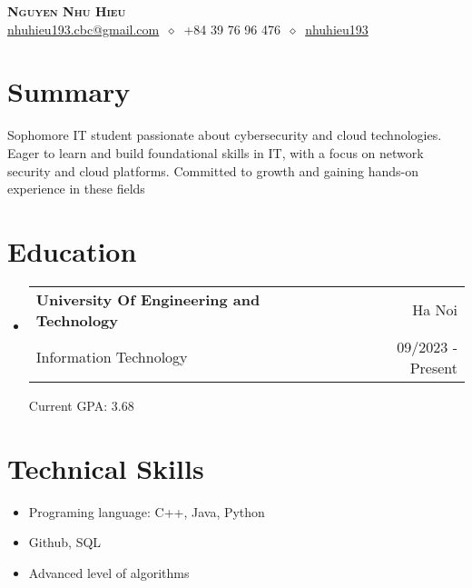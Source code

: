 \documentclass[letterpaper,11pt]{article}
\makeatletter
\newcommand{\cvitem}[1]{
  \item\small{
    {#1\vspace{-2pt}}
  }
}
\newcommand{\cvheading}[4]{
  \vspace{-2pt}\item
    \begin{tabular*}{\textwidth}[t]{l@{\extracolsep{\fill}}r}
      \textbf{#1} & #2 \\
      \small#3 & \small #4 \\
    \end{tabular*}\vspace{-7pt}
}
\newcommand{\cvheadingstart}{\begin{itemize}[leftmargin=0in, label={}]}
\newcommand{\cvheadingend}{\end{itemize}}
\newcommand{\cvitemstart}{\begin{itemize}\justifying}
\newcommand{\cvitemend}{\end{itemize}\vspace{-5pt}}
\makeatother
\begin{document}
\begin{center}
  \textbf{\LARGE\scshape Nguyen Nhu Hieu} \\
  \vspace{1pt}\small
  \href{mailto:}{nhuhieu193.cbc@gmail.com}
  $\ \diamond\ $ 
  +84 39 76 96 476
  $\ \diamond\ $
  \href{https://github.com/}{nhuhieu193}
\end{center}




\section{Summary}
Sophomore IT student passionate about cybersecurity and cloud technologies. Eager to learn and build foundational skills in IT, with a focus on network security and cloud platforms. Committed to growth and gaining hands-on experience in these fields

\section{Education}
\cvheadingstart
  \cvheading
    {University Of Engineering and Technology}{Ha Noi}
    {Information Technology}{09/2023 - Present}

    {Current GPA: 3.68}

\cvheadingend

\section{Technical Skills}
    \cvitemstart
        \cvitem {Programing language: C++, Java, Python}
        \cvitem {Github, SQL}
        \cvitem {Advanced level of algorithms}
    \cvitemend
\end{document}
